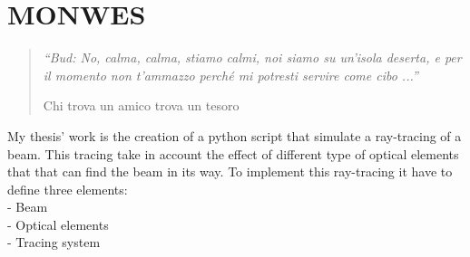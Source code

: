 \chapter{MONWES}
\label{capitolo3}
\thispagestyle{empty}

\begin{quotation}
{\footnotesize
\noindent \emph{``Bud: No, calma, calma, stiamo calmi, noi siamo su un'isola deserta, e per il momento non t'ammazzo perch\'e mi potresti servire come cibo ...''}
\begin{flushright}
Chi trova un amico trova un tesoro
\end{flushright}
}
\end{quotation}
\vspace{0.5cm}

My thesis' work is the creation of a python script that simulate a ray-tracing of a beam. This tracing take in account the effect of different type of optical elements that that can find the beam in its way. To implement this ray-tracing it have to define three elements:
\\ - Beam
\\ - Optical elements
\\ - Tracing system

\vspace{0.5cm}

